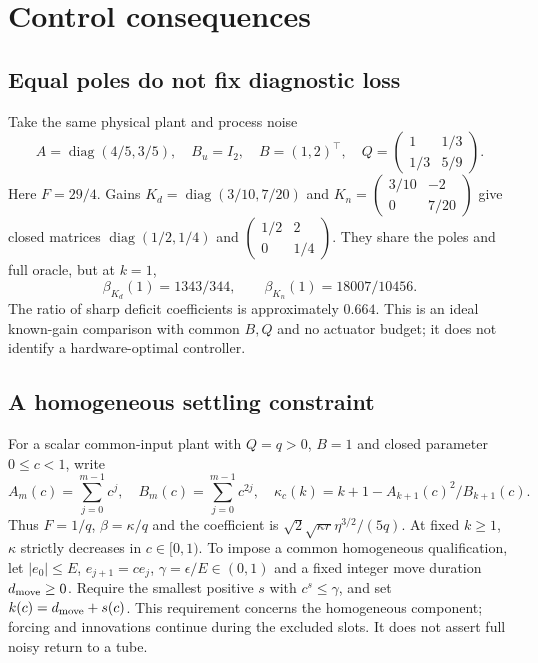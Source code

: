 \documentclass[11pt]{article}
\begin{document}
\section{Control consequences}
\subsection{Equal poles do not fix diagnostic loss}
Take the same physical plant and process noise
\[
A=\operatorname{diag}(4/5,3/5),\quad B_u=I_2,\quad B=(1,2)^\top,
\quad Q=\begin{pmatrix}1&1/3\\1/3&5/9\end{pmatrix}.
\]
Here $F=29/4$. Gains
$K_d=\operatorname{diag}(3/10,7/20)$ and
$K_n=\left(\begin{smallmatrix}3/10&-2\\0&7/20\end{smallmatrix}\right)$
give closed matrices $\operatorname{diag}(1/2,1/4)$ and
$\left(\begin{smallmatrix}1/2&2\\0&1/4\end{smallmatrix}\right)$.
They share the poles and full oracle, but at $k=1$,
\[
\beta_{K_d}(1)=1343/344,\qquad \beta_{K_n}(1)=18007/10456.
\]
The ratio of sharp deficit coefficients is approximately $0.664$.
This is an ideal known-gain comparison with common $B,Q$ and no actuator
budget; it does not identify a hardware-optimal controller.

\subsection{A homogeneous settling constraint}
For a scalar common-input plant with $Q=q>0$, $B=1$ and closed parameter
$0\le c<1$, write
\[
A_m(c)=\sum_{j=0}^{m-1}c^j,\quad B_m(c)=\sum_{j=0}^{m-1}c^{2j},
\quad \kappa_c(k)=k+1-A_{k+1}(c)^2/B_{k+1}(c).
\]
Thus $F=1/q$, $\beta=\kappa/q$ and the coefficient is
$\sqrt{2}\sqrt{\kappa r}\eta^{3/2}/(5q)$.
At fixed $k\ge1$, $\kappa$ strictly decreases in $c\in[0,1)$.
To impose a common homogeneous qualification, let $|e_0|\le E$,
$e_{j+1}=ce_j$, $\gamma=\epsilon/E\in(0,1)$ and a fixed integer
move duration $d_{\rm move}\ge0$. Require the smallest positive $s$ with
$c^s\le\gamma$, and set $k(c)=d_{\rm move}+s(c)$.
This requirement concerns the homogeneous component; forcing and innovations
continue during the excluded slots. It does not assert full noisy return to a tube.
\end{document}
